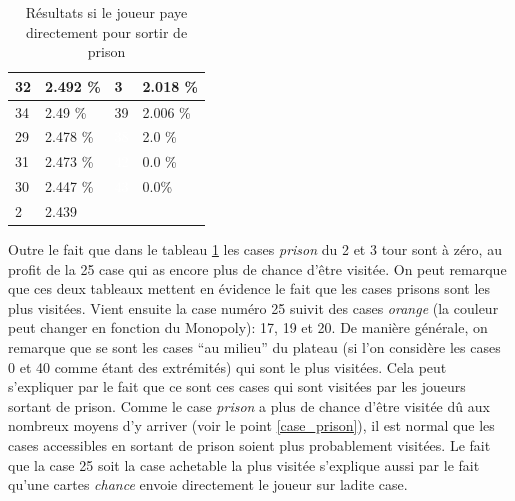 \documentclass[letterpaper]{article}
\begin{document}
\begin{table}[h]
\begin{tabular}{|l|l||l|l|}
	  \cellcolor[HTML]{2E8B57} 32 & 2.492 \%  & \cellcolor[HTML]{EEEED1}  3 & 2.018 \% \\ \hline
	  \cellcolor[HTML]{EEEED1} 34 & 2.49 \%   & \cellcolor[HTML]{8B1A1A} 39 & 2.006 \% \\ \hline
	  \cellcolor[HTML]{FFFFF0} 29 & 2.478 \%  & \cellcolor[HTML]{483D8B} \textcolor{white}{38} & 2.0 \%   \\ \hline
	  \cellcolor[HTML]{BEBEBE} 31 & 2.473 \%  & \cellcolor[HTML]{000000} \textcolor{white}{42} & 0.0 \%   \\ \hline
	  \cellcolor[HTML]{FFD700} 30 & 2.447 \%  & \cellcolor[HTML]{000000} \textcolor{white}{43} & 0.0\%    \\ \hline
	  \cellcolor[HTML]{A0522D}  2 & 2.439 \\ \cline{1-2}
	\end{tabular}
	\caption{Résultats si le joueur paye directement pour
	  sortir de prison}
	\label{result_paye}
      \end{table}
      Outre le fait que dans le tableau \ref{result_paye} les cases \textit{prison} du
      2 et 3 tour sont à zéro, au profit de la 25 case qui as
      encore plus de chance d'être visitée.  On peut remarque que ces deux tableaux
      mettent en évidence le fait que les cases prisons sont les plus visitées.
      Vient ensuite la case numéro 25 suivit des cases \textit{orange} (la couleur peut changer en
      fonction du Monopoly): 17, 19 et 20.  De manière générale, on remarque que se sont les cases
      ``au milieu'' du plateau (si l'on considère les cases 0 et 40 comme étant des extrémités) qui
      sont le plus visitées.  Cela peut s'expliquer par le fait que ce sont ces cases qui sont visitées
      par les joueurs sortant de prison.  Comme le case \textit{prison} a plus de chance
      d'être visitée dû aux nombreux moyens d'y arriver (voir le point \ref{case_prison}), il est
      normal que les cases accessibles en sortant de prison soient plus probablement visitées. Le fait
      que la case 25 soit la case achetable la plus visitée s'explique aussi par le fait qu'une
      cartes \textit{chance} envoie directement le joueur sur ladite case.
\end{document}

